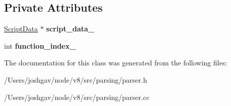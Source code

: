 \subsection*{Private Attributes}
\begin{DoxyCompactItemize}
\item 
\hyperlink{classv8_1_1internal_1_1_script_data}{Script\+Data} $\ast$ {\bfseries script\+\_\+data\+\_\+}\hypertarget{classv8_1_1internal_1_1_parse_data_a9f8512ad325720c7f31e3b0c9fdc4507}{}\label{classv8_1_1internal_1_1_parse_data_a9f8512ad325720c7f31e3b0c9fdc4507}

\item 
int {\bfseries function\+\_\+index\+\_\+}\hypertarget{classv8_1_1internal_1_1_parse_data_a45922b114279f6829c32423073ef638e}{}\label{classv8_1_1internal_1_1_parse_data_a45922b114279f6829c32423073ef638e}

\end{DoxyCompactItemize}


The documentation for this class was generated from the following files\+:\begin{DoxyCompactItemize}
\item 
/\+Users/joshgav/node/v8/src/parsing/parser.\+h\item 
/\+Users/joshgav/node/v8/src/parsing/parser.\+cc\end{DoxyCompactItemize}
